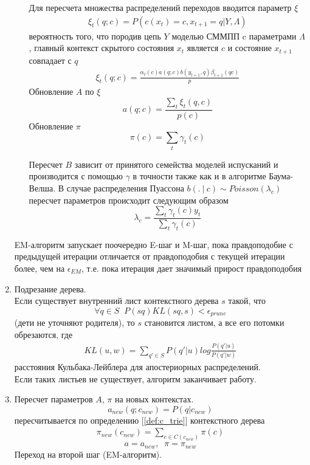 \documentclass{matmex-diploma-custom}
\begin{document}
\begin{enumerate}
\begin{enumerate}
Для пересчета множества распределений переходов вводится параметр $\xi$
\begin{align*}
\xi_{t}(q;c) = P(c(x_{t})=c, x_{t+1} = q| Y, \Lambda)
\end{align*}
вероятность того, что породив цепь $Y$ моделью СММПП c параметрами $\Lambda$, 
главный контекст скрытого состояния $ x_{t} $ является $c$ и состояние $ x_{t+1} $ совпадает с $q$
\begin{align*}
\xi_{t}(q;c) = \frac{\alpha_{t}(c)a(q;c)b(y_{t+1},q)\beta_{t+1}(qc)}{p} 
\end{align*}
Обновление $ A $ по $ \xi $\\
$$ a(q; c) = \frac{\sum_{t}\xi_{t}(q,c)}{p(c)}$$
Обновление $\pi$
$$\pi(c) = \sum_{t}\gamma_{t}(c)$$

Пересчет $ B $ зависит от принятого семейства моделей испусканий и производится с помощью $ \gamma $ в точности также как и в алгоритме Баума-Велша.
В случае распределения Пуассона
$b(.~|~c) \sim \textit{Poisson}(\lambda_{c})$ 
пересчет параметров происходит следующим образом
$$ \lambda_{c} = \frac{\sum_{t}{\gamma_{t}(c)y_{t}}}{\sum_{t}{\gamma_{t}(c)}}$$
\end{enumerate}
EM-алгоритм запускает поочередно E-шаг и M-шаг, пока правдоподобие с предыдущей итерации отличается от правдоподобия с текущей итерации более, чем на $ \epsilon_{\textit{EM}}$, т.е. пока итерация дает значимый прирост правдоподобия
\item Подрезание дерева.\\
Если существует внутренний лист контекстного дерева $ s $ такой, что 
$$ \forall q \in S \;\; P(sq)\textit{KL}(sq, s) < \epsilon_{\textit{prune}} $$
(дети не уточняют родителя), то $ s $ становится листом, а все его потомки обрезаются, где
\begin{align*}
\textit{KL}(u, w) = \sum_{q' \in S} P(q'|u) log\frac{P(q'|u)}{P(q'|w)}
\end{align*}
расстояния Кульбака-Лейблера для апостериорных распределений.
\\Если таких листьев не существует, алгоритм заканчивает работу.
\item Пересчет параметров $ A $, $\pi$ на новых контекстах.
$$a_{\textit{new}}(q; c_{\textit{new}}) = P(q| c_{\textit{new}})$$
пересчитывается по определению [\ref{def:c_trie}] контекстного дерева
\begin{align*}
\pi_{\textit{new}}(c_{\textit{new}}) = \sum_{c \in C(c_{\textit{new}})}{\pi(c)}
\end{align*}
$$
a = a_{\textit{new}},\;\;
\pi = \pi_{\textit{new}}
$$
Переход на второй шаг (EM-алгоритм).

\end{enumerate}
\end{document}
